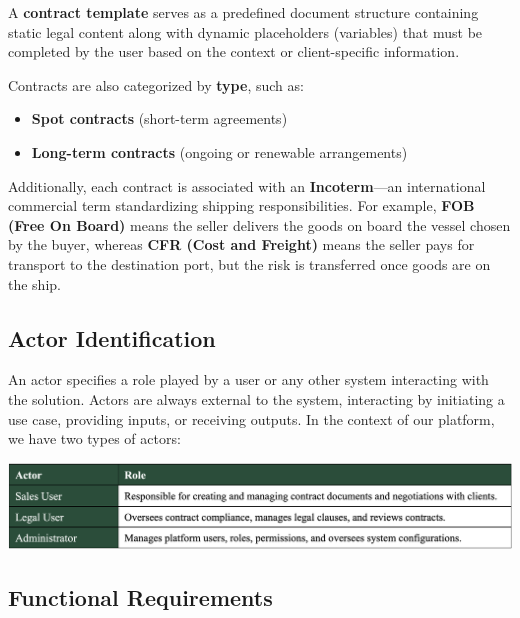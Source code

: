 A \textbf{contract template} serves as a predefined document structure containing static legal content along with dynamic placeholders (variables) that must be completed by the user based on the context or client-specific information.\mynewline

Contracts are also categorized by \textbf{type}, such as:

\begin{itemize}
    \item \textbf{Spot contracts} (short-term agreements)
    \item \textbf{Long-term contracts} (ongoing or renewable arrangements)
\end{itemize}

Additionally, each contract is associated with an \textbf{Incoterm}—an international commercial term standardizing shipping responsibilities. For example, \textbf{FOB (Free On Board)} means the seller delivers the goods on board the vessel chosen by the buyer, whereas \textbf{CFR (Cost and Freight)} means the seller pays for transport to the destination port, but the risk is transferred once goods are on the ship.

\subsection{Actor Identification}
An actor specifies a role played by a user or any other system interacting with the solution. Actors are always external to the system, interacting by initiating a use case, providing inputs, or receiving outputs. In the context of our platform, we have two types of actors:

\begin{center}
    \centering
    \includegraphics[width=1\textwidth]{Images/Actors and Their Roles.png}
    \label{tab:actors_and_roles}
\end{center}

\subsection{Functional Requirements}

